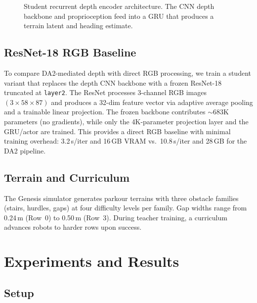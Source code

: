 \documentclass[10pt,twocolumn]{article}
\begin{document}
\begin{figure}[t]
  \centering
  \caption{Student recurrent depth encoder architecture.  The CNN
    depth backbone and proprioception feed into a GRU that produces
  a terrain latent and heading estimate.}
  \label{fig:student_arch}
\end{figure}

\subsection{ResNet-18 RGB Baseline}
\label{sec:resnet}

To compare DA2-mediated depth with direct RGB processing, we train a
student variant that replaces the depth CNN backbone with a frozen
ResNet-18 \cite{he2016deep} truncated at \texttt{layer2}.  The
ResNet processes 3-channel RGB images $(3 \times 58 \times 87)$ and
produces a 32-dim feature vector via adaptive average pooling and a
trainable linear projection.  The frozen backbone contributes
$\sim$683K parameters (no gradients), while only the 4K-parameter
projection layer and the GRU/actor are trained.  This provides a
direct RGB baseline with minimal training overhead: 3.2\,s/iter and
16\,GB VRAM vs.\ 10.8\,s/iter and 28\,GB for the DA2 pipeline.

\subsection{Terrain and Curriculum}

The Genesis simulator generates parkour terrains with three obstacle
families (stairs, hurdles, gaps) at four difficulty levels per family.
Gap widths range from 0.24\,m (Row~0) to 0.50\,m (Row~3).  During
teacher training, a curriculum advances robots to harder rows upon
success.


\section{Experiments and Results}
\label{sec:experiments}

\subsection{Setup}
\end{document}
